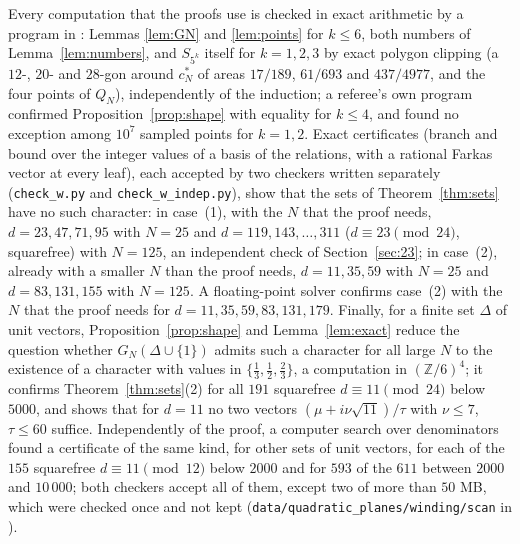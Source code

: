 \documentclass[11pt,a4paper]{amsart}
\theoremstyle{remark}
\newcommand{\Z}{\mathbb{Z}}
\begin{document}
Every computation that the proofs use is checked in exact arithmetic by a program in \cite{Repo}: Lemmas
\ref{lem:GN} and \ref{lem:points} for $k\le6$, both numbers of Lemma~\ref{lem:numbers}, and $S_{5^k}$ itself for
$k=1,2,3$ by exact polygon clipping (a $12$-, $20$- and $28$-gon around $c^*_N$ of areas $17/189$, $61/693$ and
$437/4977$, and the four points of $Q_N$), independently of the induction; a referee's own program confirmed
Proposition~\ref{prop:shape} with equality for $k\le4$, and found no exception among $10^7$ sampled points for
$k=1,2$. Exact certificates (branch and bound over the integer values of a basis of the relations, with a rational
Farkas vector at every leaf), each accepted by two checkers written separately (\nolinkurl{check_w.py} and
\nolinkurl{check_w_indep.py}), show that the sets of Theorem~\ref{thm:sets} have no such character: in case~(1),
with the $N$ that the proof needs, $d=23,47,71,95$ with $N=25$ and $d=119,143,\dots,311$ ($d\equiv23\pmod{24}$,
squarefree) with $N=125$, an independent check of Section~\ref{sec:23}; in case~(2), already with a smaller $N$
than the proof needs, $d=11,35,59$ with $N=25$ and $d=83,131,155$ with $N=125$. A floating-point solver confirms case~(2) with the $N$ that the proof needs for
$d=11,35,59,83,131,179$. Finally, for a finite set $\Delta$ of unit vectors, Proposition~\ref{prop:shape} and
Lemma~\ref{lem:exact} reduce the question whether $G_N(\Delta\cup\{1\})$ admits such a character for all large $N$ to
the existence of a character with values in $\{\frac13,\frac12,\frac23\}$, a computation in $(\Z/6)^4$; it confirms
Theorem~\ref{thm:sets}(2) for all $191$ squarefree $d\equiv11\pmod{24}$ below $5000$, and shows that for $d=11$ no
two vectors $(\mu+i\nu\sqrt{11})/\tau$ with $\nu\le7$, $\tau\le60$ suffice. Independently of the proof, a computer
search over denominators found a certificate of the same kind, for other sets of unit vectors, for each of the
$155$ squarefree $d\equiv11\pmod{12}$ below $2000$ and for $593$ of the $611$ between $2000$ and $10\,000$; both
checkers accept all of them, except two of more than $50$ MB, which were checked once and not kept
(\nolinkurl{data/quadratic_planes/winding/scan} in \cite{Repo}).
\end{document}
